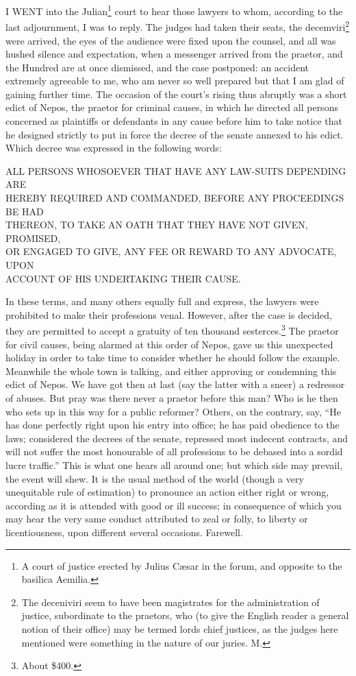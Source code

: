
I WENT into the Julian\footnote{A court of justice
erected by Julius Cæsar in the forum, and opposite to the basilica
Aemilia.} court to hear those lawyers to whom,
according to the last adjournment, I was to reply. The judges had taken
their seats, the decemviri\footnote{The deceniviri seem to
have been magistrates for the administration of justice, subordinate to
the praetors, who (to give the English reader a general notion of their
office) may be termed lords chief justices, as the judges here mentioned
were something in the nature of our juries. M.} were arrived, the eyes of the audience were
fixed upon the counsel, and all was hushed silence and expectation, when a
messenger arrived from the praetor, and the Hundred are at once dismissed,
and the case postponed: an accident extremely agreeable to me, who am
never so well prepared but that I am glad of gaining further time. The
occasion of the court's rising thus abruptly was a short edict of Nepos,
the praetor for criminal causes, in which he directed all persons
concerned as plaintiffs or defendants in any cause before him to take
notice that he designed strictly to put in force the decree of the senate
annexed to his edict. Which decree was expressed in the following words:

ALL PERSONS WHOSOEVER THAT HAVE ANY LAW-SUITS DEPENDING ARE\\
HEREBY REQUIRED AND COMMANDED, BEFORE ANY PROCEEDINGS BE HAD\\
THEREON, TO TAKE AN OATH THAT THEY HAVE NOT GIVEN, PROMISED,\\
OR ENGAGED TO GIVE, ANY FEE OR REWARD TO ANY ADVOCATE, UPON\\
ACCOUNT OF HIS UNDERTAKING THEIR CAUSE.

In these terms, and many others equally full and express, the lawyers were
prohibited to make their professions venal. However, after the case is
decided, they are permitted to accept a gratuity of ten thousand
sesterces.\footnote{About \$400.}
The praetor for civil causes, being alarmed at this order of Nepos, gave
us this unexpected holiday in order to take time to consider whether he
should follow the example. Meanwhile the whole town is talking, and either
approving or condemning this edict of Nepos. We have got then at last (say
the latter with a sneer) a redressor of abuses. But pray was there never a
praetor before this man? Who is he then who sets up in this way for a
public reformer? Others, on the contrary, say, ``He has done perfectly
right upon his entry into office; he has paid obedience to the laws;
considered the decrees of the senate, repressed most indecent contracts,
and will not suffer the most honourable of all professions to be debased
into a sordid lucre traffic.'' This is what one hears all around one; but
which side may prevail, the event will shew. It is the usual method of the
world (though a very unequitable rule of estimation) to pronounce an
action either right or wrong, according as it is attended with good or ill
success; in consequence of which you may hear the very same conduct
attributed to zeal or folly, to liberty or licentiousness, upon different
several occasions. Farewell.

